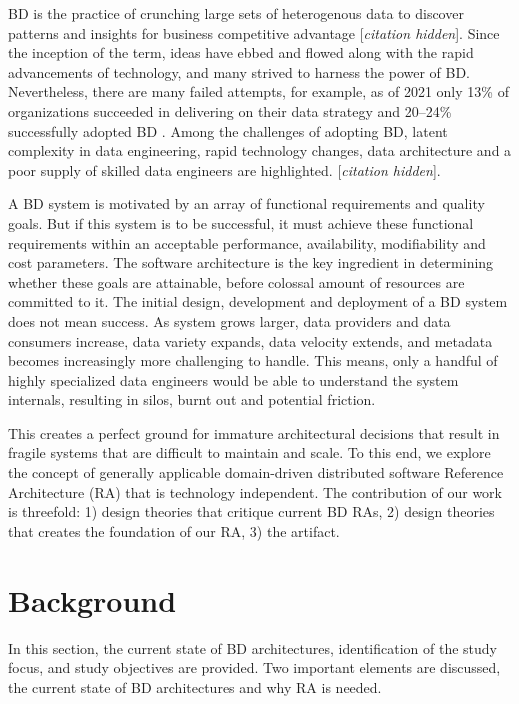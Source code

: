 \documentclass[a4paper,11pt]{article}
\let\cite\citep
\newcommand{\hc}{[\textit{citation hidden}]\textnormal{}}
\begin{document}
BD is the practice of crunching large sets of heterogenous data to discover patterns and insights for business competitive advantage 
\hc{}.
 Since the inception of the term, ideas have ebbed and flowed along with the rapid advancements of technology, and many strived to harness the power of BD. Nevertheless, there are many failed attempts, for example, as of 2021 only 13\%{} of organizations succeeded in delivering on their data strategy \cite{DataBricksSurvey} and 20--24\%{} successfully adopted BD \cite{NewVantageSurvey,GartnerSury}. Among the challenges of adopting BD, latent complexity in data engineering, rapid technology changes, data architecture and a poor supply of skilled data engineers are highlighted. 
\hc{}.  

A BD system is motivated by an array of functional requirements and quality goals. But if this system is to be successful, it must achieve these functional requirements within an acceptable performance, availability, modifiability and cost parameters. The software architecture is the key ingredient in determining whether these goals are attainable, before colossal amount of resources are committed to it. The initial design, development and deployment of a BD system does not mean success. As system grows larger, data providers and data consumers increase, data variety expands, data velocity extends, and metadata becomes increasingly more challenging to handle. This means, only a handful of highly specialized data engineers would be able to understand the system internals, resulting in silos, burnt out and potential friction.

This creates a perfect ground for immature architectural decisions that result in fragile systems that are difficult to maintain and scale. To this end, we explore the concept of generally applicable domain-driven distributed software Reference Architecture (RA) that is technology independent. The contribution of our work is threefold: 1) design theories that critique current BD RAs, 2) design theories that creates the foundation of our RA, 3) the artifact. 


\section{Background}
In this section, the current state of BD architectures, identification of the study focus, and study objectives are provided. Two important elements are discussed, the current state of BD architectures and why RA is needed.
\end{document}
